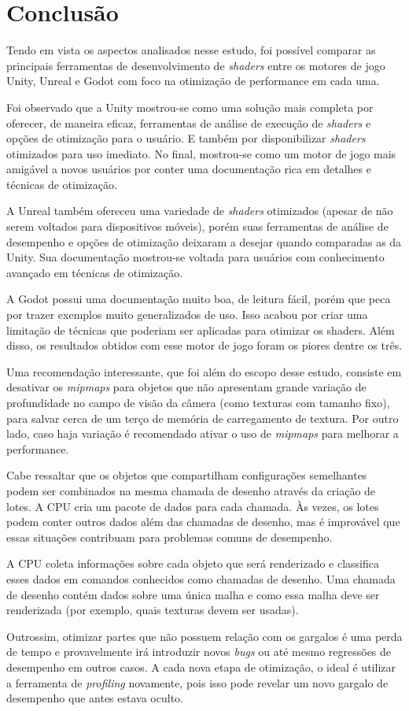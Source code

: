 \chapter{Conclusão}
\label{chap:conclusao}

Tendo em vista os aspectos analisados nesse estudo, foi possível comparar as principais ferramentas de desenvolvimento de \textit{shaders} entre os motores de jogo Unity, Unreal e Godot com foco na otimização de performance em cada uma. 

Foi observado que a Unity mostrou-se como uma solução mais completa por oferecer, de maneira eficaz, ferramentas de análise de execução de \textit{shaders} e opções de otimização para o usuário. E também por disponibilizar \textit{shaders} otimizados para uso imediato. No final, mostrou-se como um motor de jogo mais amigável a novos usuários por conter uma documentação rica em detalhes e técnicas de otimização.

A Unreal também ofereceu uma variedade de \textit{shaders} otimizados (apesar de não serem voltados para dispositivos móveis), porém suas ferramentas de análise de desempenho e opções de otimização deixaram a desejar quando comparadas as da Unity. Sua documentação mostrou-se voltada para usuários com conhecimento avançado em técnicas de otimização. 

A Godot possui uma documentação muito boa, de leitura fácil, porém que peca por trazer exemplos muito generalizados de uso. Isso acabou por criar uma limitação de técnicas que poderiam ser aplicadas para otimizar os shaders. Além disso, os resultados obtidos com esse motor de jogo foram os piores dentre os três.

Uma recomendação interessante, que foi além do escopo desse estudo, consiste em desativar os \textit{mipmaps} para objetos que não apresentam grande variação de profundidade no campo de visão da câmera (como texturas com tamanho fixo), para salvar cerca de um terço de memória de carregamento de textura. Por outro lado, caso haja variação é recomendado ativar o uso de \textit{mipmaps} para melhorar a performance.

Cabe ressaltar que os objetos que compartilham configurações semelhantes podem ser combinados na mesma chamada de desenho através da criação de lotes. A CPU cria um pacote de dados para cada chamada. Às vezes, os lotes podem conter outros dados além das chamadas de desenho, mas é improvável que essas situações contribuam para problemas comuns de desempenho.

A CPU coleta informações sobre cada objeto que será renderizado e classifica esses dados em comandos conhecidos como chamadas de desenho. Uma chamada de desenho contém dados sobre uma única malha e como essa malha deve ser renderizada (por exemplo, quais texturas devem ser usadas). 

Outrossim, otimizar partes que não possuem relação com os gargalos é uma perda de tempo e provavelmente irá introduzir novos \textit{bugs} ou até mesmo regressões de desempenho em outros casos. A cada nova etapa de otimização, o ideal é utilizar a ferramenta de \textit{profiling} novamente, pois isso pode revelar um novo gargalo de desempenho que antes estava oculto.
